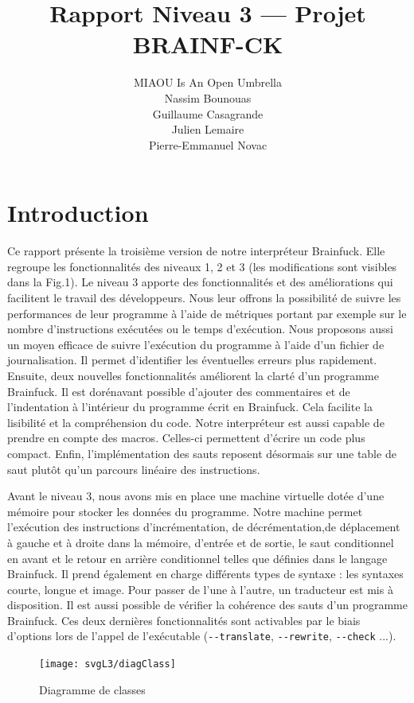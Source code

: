 \documentclass[titlepage]{article}
\author{MIAOU Is An Open Umbrella\\Nassim Bounouas\\Guillaume Casagrande\\Julien Lemaire\\Pierre-Emmanuel Novac}
\title{\vspace{-1cm}Rapport Niveau 3 --- Projet BRAINF-CK}
\begin{document}
\maketitle

\section{Introduction}

    Ce rapport présente la troisième version de notre interpréteur Brainfuck. Elle regroupe les fonctionnalités des niveaux 1, 2 et 3 (les modifications sont visibles dans la Fig.1).
    Le niveau 3 apporte des fonctionnalités et des améliorations qui facilitent le travail des développeurs. Nous leur offrons la possibilité de suivre les performances de leur programme à l’aide de métriques portant par exemple sur le nombre d'instructions exécutées ou le temps d'exécution. Nous proposons aussi un moyen efficace de suivre l’exécution du programme à l'aide d'un fichier de journalisation. Il permet d’identifier les éventuelles erreurs plus rapidement. Ensuite, deux nouvelles fonctionnalités améliorent la clarté d'un programme Brainfuck. Il est dorénavant possible d’ajouter des commentaires et de l'indentation à l’intérieur du programme écrit en Brainfuck. Cela facilite la lisibilité et la compréhension du code. Notre interpréteur est aussi capable de prendre en compte des macros. Celles-ci permettent d’écrire un code plus compact. Enfin, l'implémentation des sauts reposent désormais sur une table de saut plutôt qu'un parcours linéaire des instructions.

    Avant le niveau 3, nous avons mis en place une machine virtuelle dotée d'une mémoire pour stocker les données du programme. Notre machine permet l'exécution des instructions d'incrémentation, de décrémentation,de déplacement à gauche et à droite dans la mémoire, d'entrée et de sortie, le saut conditionnel en avant et le retour en arrière conditionnel telles que définies dans le langage Brainfuck. Il prend également en charge différents types de syntaxe : les syntaxes courte, longue et image. Pour passer de l’une à l’autre, un traducteur est mis à disposition. Il est aussi possible de vérifier la cohérence des sauts d’un programme Brainfuck. Ces deux dernières fonctionnalités sont activables par le biais d'options lors de l'appel de l'exécutable (\texttt{-{}-translate}, \texttt{-{}-rewrite}, \texttt{-{}-check} ...).

\begin{figure}[!ht]
	\centering
	\texttt{[image: svgL3/diagClass]}
	\caption{Diagramme de classes}
\end{figure}
\end{document}
